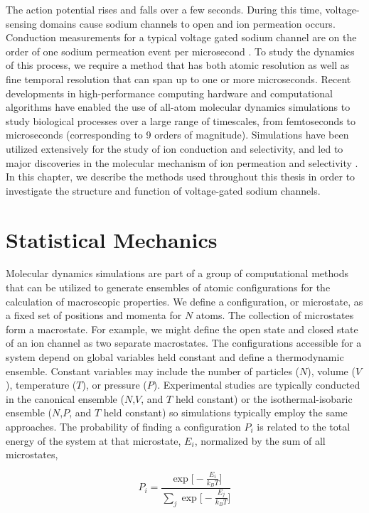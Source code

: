 \begin{refsection}
The action potential rises and falls over a few seconds. During this time, voltage-sensing domains cause sodium channels to open and ion permeation occurs. Conduction measurements for a typical voltage gated sodium channel are on the order of one sodium permeation event per microsecond \cite{Hille:2001tw}. To study the dynamics of this process, we require a method that has both atomic resolution as well as fine temporal resolution that can span up to one or more microseconds. Recent developments in high-performance computing hardware and computational algorithms have enabled the use of all-atom molecular dynamics simulations to study biological processes over a large range of timescales, from femtoseconds to microseconds (corresponding to 9 orders of magnitude). Simulations have been utilized extensively for the study of ion conduction and selectivity, and led to major discoveries in the molecular mechanism of ion permeation and selectivity \cite{Dror:2010gy}. In this chapter, we describe the methods used throughout this thesis in order to investigate the structure and function of voltage-gated sodium channels.

\section{Statistical Mechanics}

Molecular dynamics simulations are part of a group of computational methods that can be utilized to generate ensembles of atomic configurations for the calculation of macroscopic properties. We define a configuration, or microstate, as a fixed set of positions and momenta for $N$ atoms. The collection of microstates form a macrostate. For example, we might define the open state and closed state of an ion channel as two separate macrostates. The configurations accessible for a system depend on global variables held constant and define a thermodynamic ensemble. Constant variables may include the number of particles ($N$), volume ($V$), temperature ($T$), or pressure ($P$). Experimental studies are typically conducted in the canonical ensemble ($N$,$V$, and $T$ held constant) or the isothermal-isobaric ensemble ($N$,$P$, and $T$ held constant) so simulations typically employ the same approaches. The probability of finding a configuration $P_i$ is related to the total energy of the system at that microstate, $E_i$, normalized by the sum of all microstates,

\begin{equation}
\label{eq:1}
P_i = \frac{ \exp \big[ - \frac{E_{i}}{k_B T}\big]  }{  \sum_{j} \exp \big[ - \frac{E_{j}}{k_B T} \big]  }
\end{equation}


\end{refsection}

